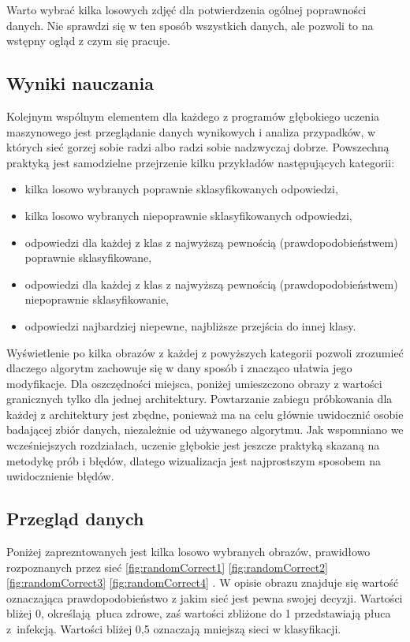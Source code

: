 \documentclass[12pt,a4paper,twoside,titlepage,openright]{book}
\begin{document}
Warto wybrać kilka losowych zdjęć dla potwierdzenia ogólnej poprawności danych. Nie sprawdzi się w ten sposób wszystkich danych, ale pozwoli to na wstępny ogląd z czym się pracuje.

\subsection{Wyniki nauczania}
Kolejnym wspólnym elementem dla każdego z programów głębokiego uczenia maszynowego jest przeglądanie danych wynikowych i analiza przypadków, w których sieć gorzej sobie radzi albo radzi sobie nadzwyczaj dobrze. Powszechną praktyką jest samodzielne przejrzenie kilku przykładów następujących kategorii:
\begin{itemize}
\item kilka losowo wybranych poprawnie sklasyfikowanych odpowiedzi,
\item kilka losowo wybranych niepoprawnie sklasyfikowanych odpowiedzi,
\item odpowiedzi dla każdej z klas z najwyższą pewnością (prawdopodobieństwem) poprawnie sklasyfikowane,
\item odpowiedzi dla każdej z klas z najwyższą pewnością (prawdopodobieństwem) niepoprawnie sklasyfikowanie,
\item odpowiedzi najbardziej niepewne, najbliższe przejścia do innej klasy.
\end{itemize}

Wyświetlenie po kilka obrazów z każdej z powyższych kategorii pozwoli zrozumieć dlaczego algorytm zachowuje się w dany sposób i znacząco ułatwia jego modyfikacje. Dla oszczędności miejsca, poniżej umieszczono obrazy z wartości granicznych tylko dla jednej architektury. Powtarzanie zabiegu próbkowania dla każdej z architektury jest zbędne, ponieważ ma na celu głównie uwidocznić osobie badającej zbiór danych, niezależnie od używanego algorytmu. Jak wspomniano we wcześniejszych rozdziałach, uczenie głębokie jest jeszcze praktyką skazaną na metodykę prób i błędów, dlatego wizualizacja jest najprostszym sposobem na uwidocznienie błędów.

\subsection{Przegląd danych}
Poniżej zaprezntowanych jest kilka losowo wybranych obrazów, prawidłowo rozpoznanych przez sieć \ref{fig:randomCorrect1} \ref{fig:randomCorrect2} \ref{fig:randomCorrect3} \ref{fig:randomCorrect4} . W opisie obrazu znajduje się wartość oznaczająca prawdopodobieństwo z jakim sieć jest pewna swojej decyzji. Wartości bliżej 0, określają płuca zdrowe, zaś wartości zbliżone do 1 przedstawiają płuca z infekcją. Wartości bliżej 0,5 oznaczają mniejszą sieci w klasyfikacji.
\end{document}
